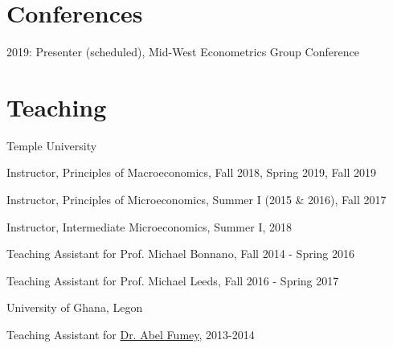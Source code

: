 \documentclass[12pt,letterpaper]{article}
\renewenvironment{itemize}{
  \begin{list}{}{
    \setlength{\leftmargin}{1.5em}
  }
}{
  \end{list}
}
\begin{document}
\section*{Conferences}
\begin{itemize}
	\item 2019: Presenter (scheduled), Mid-West Econometrics Group Conference
\end{itemize}

\section*{Teaching}
\begin{enumerate}
	\item Temple University
	\begin{itemize}
		\item Instructor, Principles of Macroeconomics, Fall 2018, Spring 2019, Fall 2019
		\item Instructor, Principles of Microeconomics, Summer I (2015 \& 2016), Fall 2017
		\item Instructor, Intermediate Microeconomics, Summer I, 2018
		\item Teaching Assistant for Prof. Michael Bonnano, Fall 2014 - Spring 2016
		\item Teaching Assistant for Prof. Michael Leeds, Fall 2016 - Spring 2017
	\end{itemize}
	\item University of Ghana, Legon
	\begin{itemize}
		\item Teaching Assistant for \href{https://www.ug.edu.gh/economics/staff/abel-fumey}{Dr. Abel Fumey}, 2013-2014
	\end{itemize}
\end{enumerate}
\end{document}
